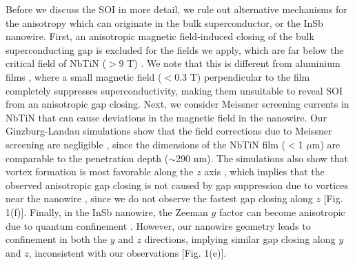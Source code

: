 Before we discuss the SOI in more detail, we rule out alternative mechanisms for the anisotropy which can originate in the bulk superconductor, or the InSb nanowire.
First, an anisotropic magnetic field-induced closing of the bulk superconducting gap is excluded for the fields we apply, which are far below the critical field of NbTiN ($>$9 T) \cite{DavidOneMin}.
We note that this is different from aluminium films \cite{Chang2015,Deng2016,Gazibegovic2017,QZBP}, where a small magnetic field ($<$0.3 T) perpendicular to the film completely suppresses superconductivity, making them unsuitable to reveal SOI from an anisotropic gap closing.
Next, we consider Meissner screening currents in NbTiN that can cause deviations in the magnetic field in the nanowire.
Our Ginzburg-Landau simulations show that the field corrections due to Meissner screening are negligible \cite{Note1}, since the dimensions of the NbTiN film ($<$1 $\mu$m) are comparable to the penetration depth ($\sim$290 nm).
The simulations also show that vortex formation is most favorable along the $z$ axis \cite{Note1}, which implies that the observed anisotropic gap closing is not caused by gap suppression due to vortices near the nanowire \cite{Takei2013}, since we do not observe the fastest gap closing along $z$ [Fig. 1(f)].
Finally, in the InSb nanowire, the Zeeman $g$ factor can become anisotropic due to quantum confinement \cite{NadjPerge2012,Pryor2006,Qu2016}.
However, our nanowire geometry leads to confinement in both the $y$ and $z$ directions, implying similar gap closing along $y$ and $z$, inconsistent with our observations [Fig. 1(e)].

